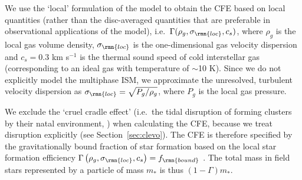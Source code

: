 \documentclass[fleqn,usenatbib]{mnras}
\begin{document}
We use the `local' formulation of the \citet{Kruijssen_12} model to obtain the CFE based on local quantities (rather than the disc-averaged quantities that are preferable in observational applications of the model), i.e.~$\Gamma (\rho_g, \sigma_\rmn{loc}, c_s)$, where $\rho_g$ is the local gas volume density, $\sigma_\rmn{loc}$ is the one-dimensional gas velocity dispersion and $c_s = 0.3$ km s$^{-1}$ is the thermal sound speed of cold interstellar gas (corresponding to an ideal gas with temperature of $\sim$10 K). Since we do not explicitly model the multiphase ISM, we approximate the unresolved, turbulent velocity dispersion as $\sigma_\rmn{loc} = \sqrt{P_g / \rho_g}$, where $P_g$ is the local gas pressure. 

We exclude the `cruel cradle effect' (i.e.~the tidal disruption of forming clusters by their natal environment, \citealt{Kruijssen_et_al_12b}) when calculating the CFE, because we treat disruption explicitly (see Section~\ref{sec:clevo}). The CFE is therefore specified by the gravitationally bound fraction of star formation based on the local star formation efficiency $\Gamma \left(\rho_g, \sigma_\rmn{loc}, c_s\right) = f_\rmn{bound}$ \citep[equation 26]{Kruijssen_12}. The total mass in field stars represented by a particle of mass $m_*$ is thus $(1-\Gamma)m_*$.
\end{document}
